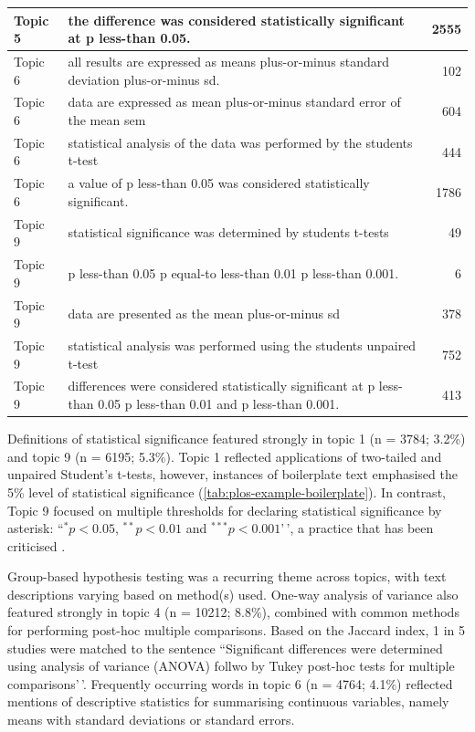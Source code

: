 \documentclass[12pt]{article}
\begin{document}
\begin{table}
\begin{tabular}[t]{l|l|r}
\hline
Topic 5 & the difference was considered statistically significant at p less-than 0.05. & 2555\\
\hline
Topic 6 & all results are expressed as means plus-or-minus standard deviation plus-or-minus sd. & 102\\
\hline
Topic 6 & data are expressed as mean plus-or-minus standard error of the mean sem & 604\\
\hline
Topic 6 & statistical analysis of the data was performed by the students t-test & 444\\
\hline
Topic 6 & a value of p less-than 0.05 was considered statistically significant. & 1786\\
\hline
Topic 9 & statistical significance was determined by students t-tests & 49\\
\hline
Topic 9 & p less-than 0.05 p equal-to less-than 0.01 p less-than 0.001. & 6\\
\hline
Topic 9 & data are presented as the mean plus-or-minus sd & 378\\
\hline
Topic 9 & statistical analysis was performed using the students unpaired t-test & 752\\
\hline
Topic 9 & differences were considered statistically significant at p less-than 0.05 p less-than 0.01 and p less-than 0.001. & 413\\
\hline
\end{tabular}
\end{table}

Definitions of statistical significance featured strongly in topic 1 (n
= 3784; 3.2\%) and topic 9 (n = 6195; 5.3\%). Topic 1 reflected
applications of two-tailed and unpaired Student's t-tests, however,
instances of boilerplate text emphasised the 5\% level of statistical
significance (\ref{tab:plos-example-boilerplate}). In contrast, Topic 9
focused on multiple thresholds for declaring statistical significance by
asterisk: ``\(^{*}p<0.05\), \(^{**}p<0.01\) and \(^{***}p<0.001\)'\,', a
practice that has been criticised \citep{Wasserstein2019}.

Group-based hypothesis testing was a recurring theme across topics, with
text descriptions varying based on method(s) used. One-way analysis of
variance also featured strongly in topic 4 (n = 10212; 8.8\%), combined
with common methods for performing post-hoc multiple comparisons. Based
on the Jaccard index, 1 in 5 studies were matched to the sentence
``Significant differences were determined using analysis of variance
(ANOVA) follwo by Tukey post-hoc tests for multiple comparisons'\,'.
Frequently occurring words in topic 6 (n = 4764; 4.1\%) reflected
mentions of descriptive statistics for summarising continuous variables,
namely means with standard deviations or standard errors.
\end{document}
